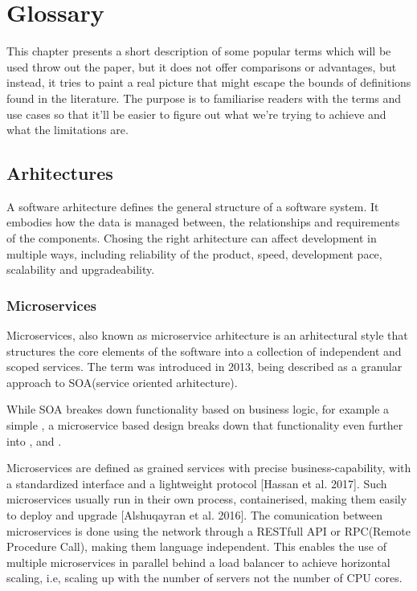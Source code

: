\chapter{Glossary}
This chapter presents a short description of some popular terms which will be used throw out the paper, but it does not offer comparisons or advantages, but instead, it tries to paint a real picture that might escape the bounds of definitions found in the literature. The purpose is to familiarise readers with the terms and use cases so that it'll be easier to figure out what we're trying to achieve and what the limitations are.


\section{Arhitectures}
A software arhitecture defines the general structure of a software system. It embodies how the data is managed between, the relationships and requirements of the components. Chosing the right arhitecture can affect development in multiple ways, including reliability of the product, speed, development pace, scalability and upgradeability.

\subsection{Microservices}
Microservices, also known as microservice arhitecture is an arhitectural style that structures the core elements of the software into a collection of independent and scoped services. The term was introduced in 2013, being described as a granular approach to SOA(service oriented arhitecture).

While SOA breakes down functionality based on business logic, for example a simple , a microservice based design breaks down that functionality even further into ,  and .

Microservices are defined as grained services with precise business-capability, with a standardized interface and a lightweight protocol [Hassan et al. 2017]. Such microservices usually run in their own process, containerised, making them easily to deploy and upgrade [Alshuqayran et al. 2016]. The comunication between microservices is done using the network through a RESTfull API or RPC(Remote Procedure Call), making them language independent. This enables the use of multiple microservices in parallel behind a load balancer to achieve horizontal scaling, i.e, scaling up with the number of servers not the number of CPU cores.

